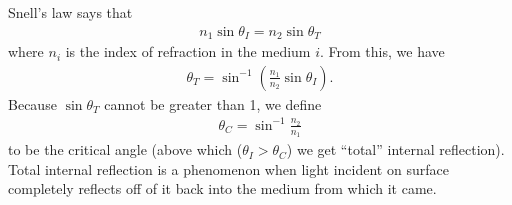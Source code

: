 \documentclass{book}
\theoremstyle{definition}
\newcommand{\f}[2]{\frac{#1}{#2}}
\newcommand{\lp}{\left(}
\newcommand{\rp}{\right)}
\begin{document}
\begin{itemize}
\begin{itemize}
		Snell's law says that
		\begin{align}
		n_1\sin\theta_I= n_2\sin\theta_T
		\end{align}
		where $n_i$ is the index of refraction in the medium $i$. From this, we have
		\begin{align}
		\theta_T = \sin^{-1}\lp \f{n_1}{n_2}\sin\theta_I \rp. 
		\end{align}
		Because $\sin\theta_T$ cannot be greater than 1, we define 
		\begin{align}
		\theta_C = \sin^{-1}\f{n_2}{n_1}
		\end{align}
		to be the critical angle (above which ($\theta_I > \theta_C$) we get ``total'' internal reflection). Total internal reflection is a phenomenon when light incident on surface completely reflects off of it back into the medium from which it came. 
		

\end{itemize}
\end{itemize}
\end{document}
